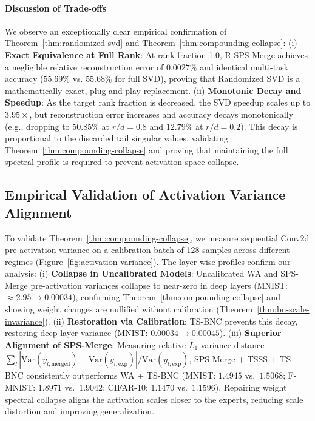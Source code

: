 \documentclass{article}
\theoremstyle{plain}
\theoremstyle{definition}
\theoremstyle{remark}
\begin{document}
\paragraph{Discussion of Trade-offs}
We observe an exceptionally clear empirical confirmation of Theorem~\ref{thm:randomized-svd} and Theorem~\ref{thm:compounding-collapse}: (i) \textbf{Exact Equivalence at Full Rank}: At rank fraction 1.0, R-SPS-Merge achieves a negligible relative reconstruction error of $0.0027\%$ and identical multi-task accuracy ($55.69\%$ vs. $55.68\%$ for full SVD), proving that Randomized SVD is a mathematically exact, plug-and-play replacement. (ii) \textbf{Monotonic Decay and Speedup}: As the target rank fraction is decreased, the SVD speedup scales up to $3.95\times$, but reconstruction error increases and accuracy decays monotonically (e.g., dropping to $50.85\%$ at $r/d=0.8$ and $12.79\%$ at $r/d=0.2$). This decay is proportional to the discarded tail singular values, validating Theorem~\ref{thm:compounding-collapse} and proving that maintaining the full spectral profile is required to prevent activation-space collapse.

\subsection{Empirical Validation of Activation Variance Alignment}
To validate Theorem~\ref{thm:compounding-collapse}, we measure sequential Conv2d pre-activation variance on a calibration batch of 128 samples across different regimes (Figure~\ref{fig:activation-variance}). The layer-wise profiles confirm our analysis: (i) \textbf{Collapse in Uncalibrated Models}: Uncalibrated WA and SPS-Merge pre-activation variances collapse to near-zero in deep layers (MNIST: $\approx 2.95 \to 0.00034$), confirming Theorem~\ref{thm:compounding-collapse} and showing weight changes are nullified without calibration (Theorem~\ref{thm:bn-scale-invariance}). (ii) \textbf{Restoration via Calibration}: TS-BNC prevents this decay, restoring deep-layer variance (MNIST: $0.00034 \to 0.00045$). (iii) \textbf{Superior Alignment of SPS-Merge}: Measuring relative $L_1$ variance distance $\sum_l | \text{Var}(y_{l, \text{merged}}) - \text{Var}(y_{l, \text{exp}}) | / \text{Var}(y_{l, \text{exp}})$, SPS-Merge + TSSS + TS-BNC consistently outperforms WA + TS-BNC (MNIST: $1.4945$ vs.\ $1.5068$; F-MNIST: $1.8971$ vs.\ $1.9042$; CIFAR-10: $1.1470$ vs.\ $1.1596$). Repairing weight spectral collapse aligns the activation scales closer to the experts, reducing scale distortion and improving generalization.
\end{document}
